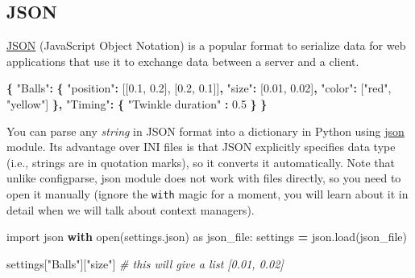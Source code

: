 \documentclass[
]{book}
\newenvironment{Shaded}{\begin{snugshade}}{\end{snugshade}}
\newcommand{\BuiltInTok}[1]{#1}
\newcommand{\CommentTok}[1]{\textcolor[rgb]{0.56,0.35,0.01}{\textit{#1}}}
\newcommand{\ControlFlowTok}[1]{\textcolor[rgb]{0.13,0.29,0.53}{\textbf{#1}}}
\newcommand{\DataTypeTok}[1]{\textcolor[rgb]{0.13,0.29,0.53}{#1}}
\newcommand{\FloatTok}[1]{\textcolor[rgb]{0.00,0.00,0.81}{#1}}
\newcommand{\FunctionTok}[1]{\textcolor[rgb]{0.13,0.29,0.53}{\textbf{#1}}}
\newcommand{\ImportTok}[1]{#1}
\newcommand{\NormalTok}[1]{#1}
\newcommand{\OperatorTok}[1]{\textcolor[rgb]{0.81,0.36,0.00}{\textbf{#1}}}
\newcommand{\OtherTok}[1]{\textcolor[rgb]{0.56,0.35,0.01}{#1}}
\newcommand{\StringTok}[1]{\textcolor[rgb]{0.31,0.60,0.02}{#1}}
\begin{document}
\hypertarget{json}{%
\subsection{JSON}\label{json}}

\href{https://en.wikipedia.org/wiki/JSON}{JSON} (JavaScript Object Notation) is a popular format to serialize data for web applications that use it to exchange data between a server and a client.

\begin{Shaded}
\begin{Highlighting}[]
\FunctionTok{\{}
  \DataTypeTok{"Balls"}\FunctionTok{:} \FunctionTok{\{}
    \DataTypeTok{"position"}\FunctionTok{:} \OtherTok{[[}\FloatTok{0.1}\OtherTok{,} \FloatTok{0.2}\OtherTok{],} \OtherTok{[}\FloatTok{0.2}\OtherTok{,} \FloatTok{0.1}\OtherTok{]]}\FunctionTok{,}
    \DataTypeTok{"size"}\FunctionTok{:} \OtherTok{[}\FloatTok{0.01}\OtherTok{,} \FloatTok{0.02}\OtherTok{]}\FunctionTok{,}
    \DataTypeTok{"color"}\FunctionTok{:} \OtherTok{[}\StringTok{"red"}\OtherTok{,} \StringTok{"yellow"}\OtherTok{]}
  \FunctionTok{\},}
  \DataTypeTok{"Timing"}\FunctionTok{:} \FunctionTok{\{}
    \DataTypeTok{"Twinkle duration"} \FunctionTok{:} \FloatTok{0.5}
  \FunctionTok{\}}
\FunctionTok{\}}
\end{Highlighting}
\end{Shaded}

You can parse any \emph{string} in JSON format into a dictionary in Python using \href{https://docs.python.org/3/library/json.html}{json} module. Its advantage over INI files is that JSON explicitly specifies data type (i.e., strings are in quotation marks), so it converts it automatically. Note that unlike configparse, json module does not work with files directly, so you need to open it manually (ignore the \texttt{with} magic for a moment, you will learn about it in detail when we will talk about context managers).

\begin{Shaded}
\begin{Highlighting}[]
\ImportTok{import}\NormalTok{ json}
\ControlFlowTok{with} \BuiltInTok{open}\NormalTok{(}\StringTok{\textquotesingle{}settings.json\textquotesingle{}}\NormalTok{) }\ImportTok{as}\NormalTok{ json\_file:}
\NormalTok{    settings }\OperatorTok{=}\NormalTok{ json.load(json\_file)}
    
\NormalTok{settings[}\StringTok{"Balls"}\NormalTok{][}\StringTok{"size"}\NormalTok{] }\CommentTok{\# this will give a list [0.01, 0.02]}
\end{Highlighting}
\end{Shaded}
\end{document}
